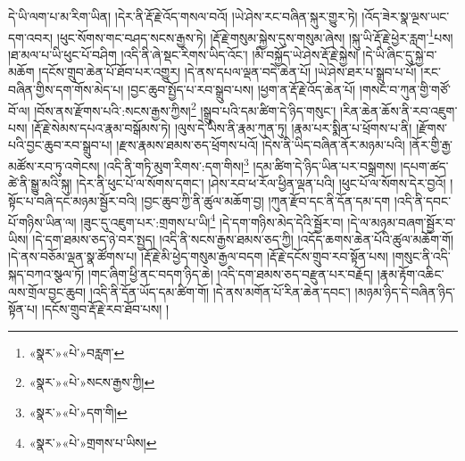 དེ་ཡི་ལག་པ་མ་རིག་ཡིན། །དེར་ནི་རྡོ་རྗེ་འོད་གསལ་བའོ། །ཡེ་ཤེས་རང་བཞིན་སྐུར་གྱུར་ཏེ། །འོད་ཟེར་སྣ་ལྔས་ཡང་དག་འབར། །ཕུང་སོགས་གང་བཤད་སངས་རྒྱས་ཏེ། །རྡོ་རྗེ་གསུམ་སྐྱེས་དུས་གསུམ་ཞེས། །སྐུ་ཡི་རྡོ་རྗེ་ཕྱེར་རླག་\footnote{«སྣར་»«པེ་»བརླག་}པས། །ཐ་མལ་པ་ཡི་ཕུང་པོ་བཤིག །འདི་ནི་ཞེ་སྡང་རིགས་ཡིད་འོང་། །མི་བསྐྱོད་ཡེ་ཤེས་རྡོ་རྗེ་སྐྱེས། །དེ་ཡི་ཞིང་དུ་སྐྱེ་བ་མཆོག །དངོས་གྲུབ་ཆེན་པོ་ཐོབ་པར་འགྱུར། །དེ་ནས་དཔལ་ལྡན་བདེ་ཆེན་པོ། །ཡེ་ཤེས་ཐར་པ་སྒྲུབ་པ་པོ། །རང་བཞིན་གྱིས་དག་གོས་མེད་པ། །བྱང་ཆུབ་སྤྱོད་པ་རབ་སྒྲུབ་པས། །ཕྱག་ན་རྡོ་རྗེ་འོད་ཆེན་པོ། །གསང་བ་ཀུན་གྱི་གཙོ་བོ་ལ། །བོས་ནས་རྫོགས་པའི་:སངས་རྒྱས་ཀྱིས།\footnote{«སྣར་»«པེ་»སངས་རྒྱས་ཀྱི།} །སྒྲུབ་པའི་དམ་ཚིག་དེ་ཉིད་གསུང་། །རིན་ཆེན་ཆོས་ནི་རབ་འཇུག་པས། །རྡོ་རྗེ་སེམས་དཔའ་རྣམ་བསྒོམས་ཏེ། །ལུས་དེ་ཡིས་ནི་རྣམ་ཀུན་ཏུ། །རྣམ་པར་སྨིན་པ་ཕྲོགས་པ་ནི། །རྫོགས་པའི་བྱང་ཆུབ་རབ་སྒྲུབ་པ། །རྫས་རྣམས་ཐམས་ཅད་ཕྲོགས་པའོ། །དེས་ནི་ཡིད་བཞིན་ནོར་མཉམ་པའི། །ནོར་གྱི་རྒྱ་མཚོས་རབ་ཏུ་འགེངས། །འདི་ནི་གཏི་མུག་རིགས་:དག་གིས།\footnote{«སྣར་»«པེ་»དག་གི།} །དམ་ཚིག་དེ་ཉིད་ཡིན་པར་བསྒྲགས། །དཔག་ཚད་ཚེ་ནི་སྒྱུ་མའི་སྐུ། །དེར་ནི་ཕུང་པོ་ལ་སོགས་དགང་། །ཤེས་རབ་ཕ་རོལ་ཕྱིན་ལྡན་པའི། །ཕུང་པོ་ལ་སོགས་དེར་བྱའོ། །སྟོང་པ་བཞི་དང་མཉམ་སྦྱོར་བའི། །བྱང་ཆུབ་ཀྱི་ནི་ཚུལ་མཆོག་བྱ། །ཀུན་རྫོབ་དང་ནི་དོན་དམ་དག །འདི་ནི་དབང་པོ་གཉིས་ཡིན་ལ། །ཟུང་དུ་འཇུག་པར་:གྲགས་པ་ཡི།\footnote{«སྣར་»«པེ་»གྲགས་པ་ཡིས།} །དེ་དག་གཉིས་མེད་དེའི་སྦྱོར་བ། །དེ་ལ་མཉམ་བཞག་སྦྱོར་བ་ཡིས། །དེ་དག་ཐམས་ཅད་ཉེ་བར་སྤྱད། །འདི་ནི་སངས་རྒྱས་ཐམས་ཅད་ཀྱི། །འདོད་ཆགས་ཆེན་པོའི་ཚུལ་མཆོག་གོ། །དེ་ནས་བཅོམ་ལྡན་སྣ་ཚོགས་པ། །རྡོ་རྗེ་མི་ཕྱེད་གསུམ་རྒྱལ་བདག །རྡོ་རྗེ་དངོས་གྲུབ་རབ་སྟོན་པས། །གསུང་ནི་འདི་སྐད་བཀའ་སྩལ་ཏོ། །གང་ཞིག་ཕྱི་ནང་བདག་ཉིད་ཆེ། །འདི་དག་ཐམས་ཅད་བརྫུན་པར་བརྗོད། །རྣམ་རྟོག་འཆིང་ལས་གྲོལ་བྱང་ཆུབ། །འདི་ནི་དོན་ཡོད་དམ་ཚིག་གོ། །དེ་ནས་མགོན་པོ་རིན་ཆེན་དབང་། །མཉམ་ཉིད་དེ་བཞིན་ཉིད་སྟོན་པ། །དངོས་གྲུབ་རྡོ་རྗེ་རབ་ཐོབ་པས། །
